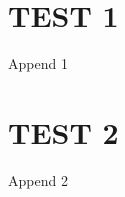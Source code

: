 \chapter{TEST 1}

\begin{subappendices} 
    Append 1
\end{subappendices}

\chapter{TEST 2}

\begin{subappendices} 
    Append 2
\end{subappendices}
